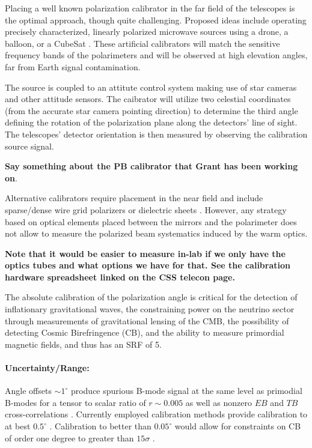Placing a well known polarization calibrator in the far field of the telescopes
is the optimal approach, though quite challenging. Proposed ideas include
operating precisely characterized, linearly polarized microwave sources using a
drone, a balloon, or a CubeSat \cite{nati_2017, Johnson2015}. These artificial
calibrators will match the sensitive frequency bands of the polarimeters and
will be observed at high elevation angles, far from Earth signal contamination.

The source is coupled to an attitute control system making use of star cameras
and other attitude sensors. The caibrator will utilize two celestial
coordinates (from the accurate star camera pointing direction) to determine the
third angle defining the rotation of the polarization plane along the
detectors' line of sight. The telescopes' detector orientation is then measured
by observing the calibration source signal. 

\textbf{Say something about the PB calibrator that Grant has been working on}.


Alternative calibrators require placement in the near field and include
sparse/dense wire grid polarizers or dielectric sheets \cite{Takahashi2010,
2016arXiv160701825K}.  However, any strategy based on optical elements placed
between the mirrors and the polarimeter does not allow to measure the polarized
beam systematics induced by the warm optics. 

\textbf{Note that it would be easier to measure in-lab if we only have the
optics tubes and what options we have for that. See the calibration hardware
spreadsheet linked on the CSS telecon page.}

The absolute calibration of the polarization angle is critical for the
detection of inflationary gravitational waves, the constraining power on the
neutrino sector through measurements of gravitational lensing of the CMB, the
possibility of detecting Cosmic Birefringence (CB), and the ability to measure
primordial magnetic fields, and thus has an SRF of 5.

\paragraph{Uncertainty/Range:}

Angle offsets $\sim 1^{\circ}$ produce spurious B-mode signal at the same level
as primodial B-modes for a tensor to scalar ratio of $r \sim 0.005$ as well as
nonzero $EB$ and $TB$ cross-correlations \cite{doi:10.1142/S0218271816400125}.
Currently employed calibration methods provide calibration to at
best $0.5^{\circ}$ \cite{2016MNRAS.455.1981K}.
Calibration to better than $0.05^{\circ}$ would allow for constraints on CB of
order one degree to greater than $15\sigma$ \cite{2016MNRAS.455.1981K}.

